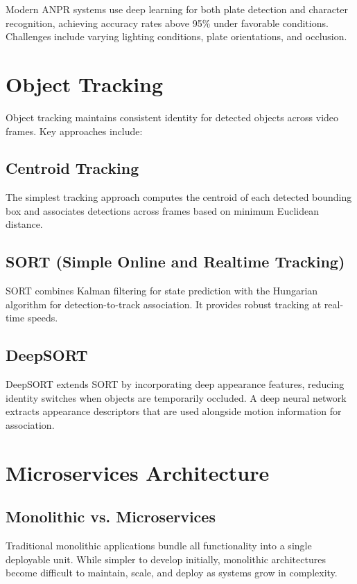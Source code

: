 \documentclass[12pt,a4paper]{report}
\begin{document}
Modern ANPR systems use deep learning for both plate detection and character recognition, achieving accuracy rates above 95\% under favorable conditions. Challenges include varying lighting conditions, plate orientations, and occlusion.

\section{Object Tracking}

Object tracking maintains consistent identity for detected objects across video frames. Key approaches include:

\subsection{Centroid Tracking}

The simplest tracking approach computes the centroid of each detected bounding box and associates detections across frames based on minimum Euclidean distance.

\subsection{SORT (Simple Online and Realtime Tracking)}

SORT combines Kalman filtering for state prediction with the Hungarian algorithm for detection-to-track association. It provides robust tracking at real-time speeds.

\subsection{DeepSORT}

DeepSORT extends SORT by incorporating deep appearance features, reducing identity switches when objects are temporarily occluded. A deep neural network extracts appearance descriptors that are used alongside motion information for association.

\section{Microservices Architecture}

\subsection{Monolithic vs. Microservices}

Traditional monolithic applications bundle all functionality into a single deployable unit. While simpler to develop initially, monolithic architectures become difficult to maintain, scale, and deploy as systems grow in complexity.
\end{document}
